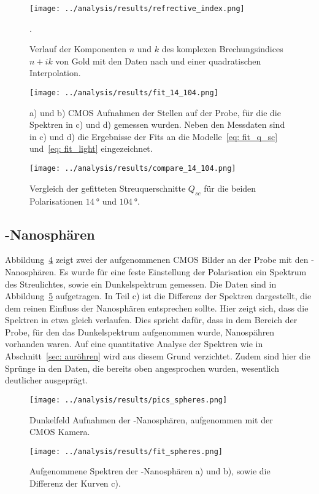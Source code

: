\begin{figure}
  \centering
  \texttt{[image: ../analysis/results/refrective\_index.png]}
  \caption{Verlauf der Komponenten $n$ und $k$ des komplexen Brechungsindices $n + i k$
  von Gold mit den Daten nach \cite{ref_index_au} und einer quadratischen Interpolation.}.
  \label{fig: ref_index}
\end{figure}


\begin{figure}
  \centering
  \texttt{[image: ../analysis/results/fit\_14\_104.png]}
  \caption{a) und b) CMOS Aufnahmen der Stellen auf der Probe, für die die Spektren in c) und d)
  gemessen wurden. Neben den Messdaten sind in c) und d) die Ergebnisse der Fits an die Modelle~\eqref{eq: fit_q_sc}
  und~\eqref{eq: fit_light} eingezeichnet.}
  \label{fig: au_röhren_fits}
\end{figure}

\begin{figure}
  \centering
  \texttt{[image: ../analysis/results/compare\_14\_104.png]}
  \caption{Vergleich der gefitteten Streuquerschnitte $Q_{sc}$ für die beiden Polarisationen $\SI{14}{\degree}$ und $\SI{104}{\degree}$.}
  \label{fig: compare_q_sc}
\end{figure}
\subsection{-Nanosphären}
Abbildung~\ref{fig: au_sphären_bilder} zeigt zwei der aufgenommenen CMOS Bilder an der Probe mit den -Nanosphären.
Es wurde für eine feste Einstellung der Polarisation ein Spektrum des Streulichtes, sowie ein
Dunkelspektrum gemessen. Die Daten sind in Abbildung~\ref{fig: au_sphären_data} aufgetragen. In Teil c) ist die Differenz
der Spektren dargestellt, die dem reinen Einfluss der Nanosphären entsprechen sollte.
Hier zeigt sich, dass die Spektren in etwa gleich verlaufen.
Dies spricht dafür, dass in dem Bereich der Probe, für den das Dunkelspektrum aufgenommen wurde, Nanospähren
vorhanden waren.
Auf eine quantitative Analyse der Spektren wie in Abschnitt~\ref{sec: auröhren} wird aus diesem Grund verzichtet.
Zudem sind hier die Sprünge in den Daten, die bereits oben angesprochen wurden, wesentlich deutlicher
ausgeprägt.


\begin{figure}
  \centering
  \texttt{[image: ../analysis/results/pics\_spheres.png]}
  \caption{Dunkelfeld Aufnahmen der -Nanosphären, aufgenommen mit der CMOS Kamera.}
  \label{fig: au_sphären_bilder}
\end{figure}

\begin{figure}
  \centering
  \texttt{[image: ../analysis/results/fit\_spheres.png]}
  \caption{Aufgenommene Spektren der -Nanosphären a) und b), sowie die Differenz der Kurven c).}
  \label{fig: au_sphären_data}
\end{figure}
